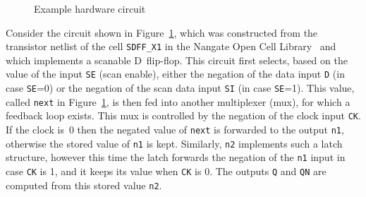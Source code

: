 \documentclass{eptcs}
\begin{document}
\begin{figure}
\begin{center}
\end{center}
\caption{Example hardware circuit}
\label{fig:Circuit}
\end{figure}

Consider the circuit shown in Figure~\ref{fig:Circuit},
which was constructed from the transistor netlist of the cell \texttt{SDFF\_X1}
in the Nangate Open Cell Library~\cite{OpenCellLibrary08_10_SP1}
and which implements a scanable D~flip-flop.
This circuit first selects, based on the value of the input
\texttt{SE} (scan enable), either the negation of the data input \texttt{D}
(in case \texttt{SE}=0)
or the negation of the scan data input \texttt{SI} (in case \texttt{SE}=1).
This value, called \texttt{next} in Figure~\ref{fig:Circuit}, is then fed into
another multiplexer (mux), for which a feedback loop exists.
This mux is controlled by the negation of the clock input \texttt{CK}. If the
clock is~0 then the negated value of \texttt{next} is forwarded to the output
\texttt{n1}, otherwise the stored value of \texttt{n1} is kept.
Similarly, \texttt{n2} implements such a latch structure, however this time the
latch forwards the negation of the \texttt{n1} input in case \texttt{CK} is 1,
and it keeps its value when \texttt{CK} is 0.
The outputs \texttt{Q} and \texttt{QN} are computed from this stored value
\texttt{n2}.
\end{document}
